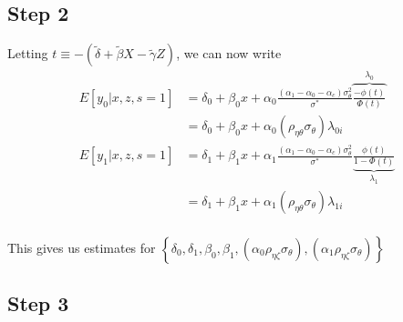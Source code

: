 \documentclass[11pt,letterpaper]{article}
\begin{document}
\subsection{Step 2}

Letting $t \equiv -(\widetilde \delta + \widetilde \beta X - \widetilde \gamma Z)$, we can now write
\begin{align*}
E[y_0 | x,z,s=1] 
&= \delta_0 + \beta_0 x + \alpha_0 \frac{(\alpha_1 - \alpha_0 - \alpha_c)\sigma^2_\theta}{\sigma^*} \overbrace{\frac{-\phi(t)}{\Phi(t)}}^{\lambda_0} \\
&= \delta_0 + \beta_0 x + \alpha_0 \left( \rho_{\eta\theta}\sigma_\theta \right) \lambda_{0i} \\
E[y_1 | x,z,s=1] 
&= \delta_1 + \beta_1 x + \alpha_1 \frac{(\alpha_1 - \alpha_0 - \alpha_c)\sigma^2_\theta}{\sigma^*} \underbrace{\frac{\phi(t)}{1-\Phi(t)}}_{\lambda_1} \\
&= \delta_1 + \beta_1 x + \alpha_1 \left( \rho_{\eta\theta}\sigma_\theta \right) \lambda_{1i} \\
\end{align*}

This gives us estimates for $\left\{ \delta_0, \delta_1, \beta_0, \beta_1, (\alpha_0\rho_{\eta\zeta}\sigma_\theta), (\alpha_1\rho_{\eta\zeta}\sigma_\theta) \right\}$

\subsection{Step 3}
\end{document}

